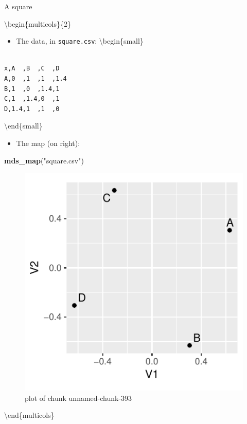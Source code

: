 \documentclass[ignorenonframetext,]{beamer}
\newenvironment{Shaded}{\begin{snugshade}}{\end{snugshade}}
\newcommand{\KeywordTok}[1]{\textcolor[rgb]{0.13,0.29,0.53}{\textbf{#1}}}
\newcommand{\NormalTok}[1]{#1}
\newcommand{\StringTok}[1]{\textcolor[rgb]{0.31,0.60,0.02}{#1}}
\providecommand{\tightlist}{%
  \setlength{\itemsep}{0pt}\setlength{\parskip}{0pt}}
\begin{document}
\begin{frame}[fragile]{A square}
\protect\hypertarget{a-square}{}

\textbackslash{}begin\{multicols\}\{2\}

\begin{itemize}
\tightlist
\item
  The data, in \texttt{square.csv}: \textbackslash{}begin\{small\}
\end{itemize}

\begin{verbatim}

x,A  ,B  ,C  ,D
A,0  ,1  ,1  ,1.4
B,1  ,0  ,1.4,1
C,1  ,1.4,0  ,1
D,1.4,1  ,1  ,0
\end{verbatim}

\textbackslash{}end\{small\}

\begin{itemize}
\tightlist
\item
  The map (on right):
\end{itemize}

\begin{Shaded}
\begin{Highlighting}[]
\KeywordTok{mds_map}\NormalTok{(}\StringTok{"square.csv"}\NormalTok{)}
\end{Highlighting}
\end{Shaded}

\begin{figure}
\centering
\includegraphics{figure/unnamed-chunk-393-1.pdf}
\caption{plot of chunk unnamed-chunk-393}
\end{figure}

\textbackslash{}end\{multicols\}

\end{frame}
\end{document}
